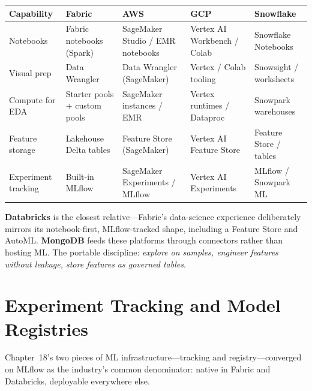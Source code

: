 \begin{center}
\footnotesize
\begin{tabular}{@{}p{2.8cm}p{3.2cm}p{3.2cm}p{3.2cm}p{3.2cm}@{}}
\toprule
\textbf{Capability} & \textbf{Fabric} & \textbf{AWS} & \textbf{GCP} & \textbf{Snowflake} \\
\midrule
Notebooks & Fabric notebooks (Spark) & SageMaker Studio / EMR notebooks & Vertex AI Workbench / Colab & Snowflake Notebooks \\
Visual prep & Data Wrangler & Data Wrangler (SageMaker) & Vertex / Colab tooling & Snowsight / worksheets \\
Compute for EDA & Starter pools + custom pools & SageMaker instances / EMR & Vertex runtimes / Dataproc & Snowpark warehouses \\
Feature storage & Lakehouse Delta tables & Feature Store (SageMaker) & Vertex AI Feature Store & Feature Store / tables \\
Experiment tracking & Built-in MLflow & SageMaker Experiments / MLflow & Vertex AI Experiments & MLflow / Snowpark ML \\
\bottomrule
\end{tabular}
\end{center}

\noindent \textbf{Databricks} is the closest relative---Fabric's data-science experience
deliberately mirrors its notebook-first, MLflow-tracked shape, including a Feature Store and
AutoML. \textbf{MongoDB} feeds these platforms through connectors rather than hosting ML. The
portable discipline: \emph{explore on samples, engineer features without leakage, store features
as governed tables}.

\section{Experiment Tracking and Model Registries}
%
Chapter~18's two pieces of ML infrastructure---tracking and registry---converged on MLflow as
the industry's common denominator: native in Fabric and Databricks, deployable everywhere else.

